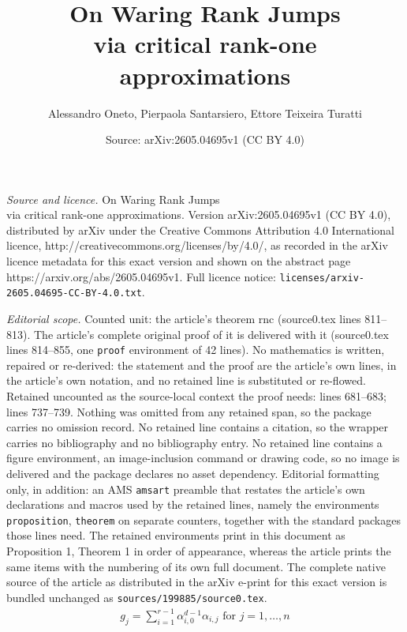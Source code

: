 \documentclass[10pt,a4paper]{amsart}
\title{On Waring Rank Jumps \\ via critical rank-one approximations}
\author{Alessandro Oneto, Pierpaola Santarsiero, Ettore Teixeira Turatti}
\date{Source: arXiv:2605.04695v1 (CC BY 4.0)}
\begin{document}
\maketitle

\noindent\emph{Source and licence.} On Waring Rank Jumps \\ via critical rank-one approximations. Version arXiv:2605.04695v1 (CC BY 4.0), distributed by arXiv under the Creative Commons Attribution 4.0 International licence, http://creativecommons.org/licenses/by/4.0/, as recorded in the arXiv licence metadata for this exact version and shown on the abstract page https://arxiv.org/abs/2605.04695v1. Full licence notice: \texttt{licenses/arxiv-2605.04695-CC-BY-4.0.txt}.\par\smallskip

\noindent\textit{Editorial scope.} Counted unit: the article's theorem rnc (source0.tex lines 811--813). The article's complete original proof of it is delivered with it (source0.tex lines 814--855, one \texttt{proof} environment of 42 lines). No mathematics is written, repaired or re-derived: the statement and the proof are the article's own lines, in the article's own notation, and no retained line is substituted or re-flowed.  Retained uncounted as the source-local context the proof needs: lines 681--683; lines 737--739.  Nothing was omitted from any retained span, so the package carries no omission record.  No retained line contains a citation, so the wrapper carries no bibliography and no bibliography entry.  No retained line contains a figure environment, an image-inclusion command or drawing code, so no image is delivered and the package declares no asset dependency.  Editorial formatting only, in addition: an AMS \texttt{amsart} preamble that restates the article's own declarations and macros used by the retained lines, namely the environments \texttt{proposition}, \texttt{theorem} on separate counters, together with the standard packages those lines need.  The retained environments print in this document as Proposition 1, Theorem 1 in order of appearance, whereas the article prints the same items with the numbering of its own full document.  The complete native source of the article as distributed in the arXiv e-print for this exact version is bundled unchanged as \texttt{sources/199885/source0.tex}.
     \begin{align}\label{eq: equations gj}
     g_j=\sum_{i=1}^{r-1}\alpha_{i,0}^{d-1}\alpha_{i,j} \text{ for }j=1,\dots, n
     \end{align}
\end{document}

